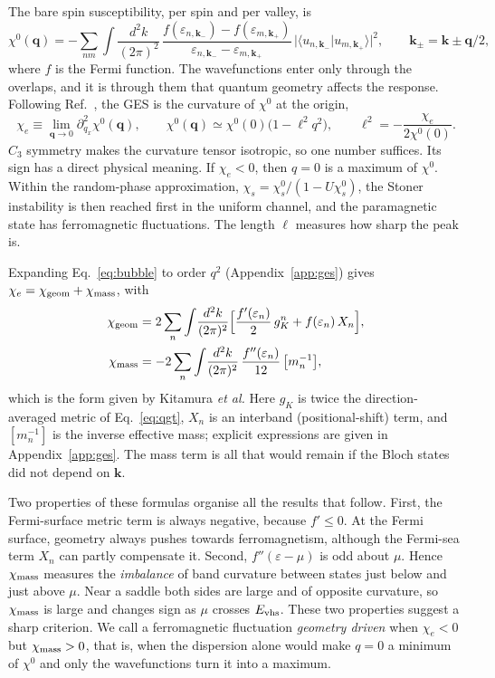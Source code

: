 \documentclass[12pt,a4paper]{article}
\newcommand{\bk}{\mathbf{k}}
\newcommand{\bq}{\mathbf{q}}
\newcommand{\chie}{\chi_{e}}
\newcommand{\chig}{\chi_{\rm geom}}
\newcommand{\chim}{\chi_{\rm mass}}
\newcommand{\Evhs}{E_{\rm vhs}}
\begin{document}
The bare spin susceptibility, per spin and per valley, is
\begin{equation}
\chi^0(\bq)=-\sum_{nm}\int\!\frac{d^2k}{(2\pi)^2}\,
\frac{f(\varepsilon_{n,\bk_-})-f(\varepsilon_{m,\bk_+})}{\varepsilon_{n,\bk_-}-\varepsilon_{m,\bk_+}}
\,\big|\langle u_{n,\bk_-}|u_{m,\bk_+}\rangle\big|^2,\qquad \bk_\pm=\bk\pm\bq/2 ,
\label{eq:bubble}
\end{equation}
where $f$ is the Fermi function. The wavefunctions enter only through the overlaps, and it is through them that quantum geometry affects the response. Following Ref.~\citep{Kitamura2024}, the GES is the curvature of $\chi^0$ at the origin,
\begin{equation}
\chie\equiv\lim_{\bq\to0}\partial_{q_x}^2\chi^0(\bq),\qquad
\chi^0(\bq)\simeq\chi^0(0)\big(1-\ell^2q^2\big),\qquad \ell^2=-\frac{\chie}{2\chi^0(0)} .
\label{eq:GESdef}
\end{equation}
$C_3$ symmetry makes the curvature tensor isotropic, so one number suffices. Its sign has a direct physical meaning. If $\chie<0$, then $q=0$ is a maximum of $\chi^0$. Within the random-phase approximation, $\chi_s=\chi^0_s/(1-U\chi^0_s)$, the Stoner instability is then reached first in the uniform channel, and the paramagnetic state has ferromagnetic fluctuations. The length $\ell$ measures how sharp the peak is.

Expanding Eq.~\eqref{eq:bubble} to order $q^2$ (Appendix~\ref{app:ges}) gives $\chie=\chig+\chim$, with
\begin{align}
\chig&=2\sum_n\int\!\frac{d^2k}{(2\pi)^2}\Big[\frac{f'(\varepsilon_n)}{2}\,g^{n}_{K}+f(\varepsilon_n)\,X_n\Big], \label{eq:chig}\\
\chim&=-2\sum_n\int\!\frac{d^2k}{(2\pi)^2}\,\frac{f''(\varepsilon_n)}{12}\,\big[m_n^{-1}\big], \label{eq:chim}
\end{align}
which is the form given by Kitamura \emph{et al.} Here $g_K$ is twice the direction-averaged metric of Eq.~\eqref{eq:qgt}, $X_n$ is an interband (positional-shift) term, and $[m_n^{-1}]$ is the inverse effective mass; explicit expressions are given in Appendix~\ref{app:ges}. The mass term is all that would remain if the Bloch states did not depend on $\bk$.

Two properties of these formulas organise all the results that follow. First, the Fermi-surface metric term is always negative, because $f'\le0$. At the Fermi surface, geometry always pushes towards ferromagnetism, although the Fermi-sea term $X_n$ can partly compensate it. Second, $f''(\varepsilon-\mu)$ is odd about $\mu$. Hence $\chim$ measures the \emph{imbalance} of band curvature between states just below and just above $\mu$. Near a saddle both sides are large and of opposite curvature, so $\chim$ is large and changes sign as $\mu$ crosses $\Evhs$. These two properties suggest a sharp criterion. We call a ferromagnetic fluctuation \emph{geometry driven} when $\chie<0$ but $\chim>0$, that is, when the dispersion alone would make $q=0$ a minimum of $\chi^0$ and only the wavefunctions turn it into a maximum.
\end{document}
